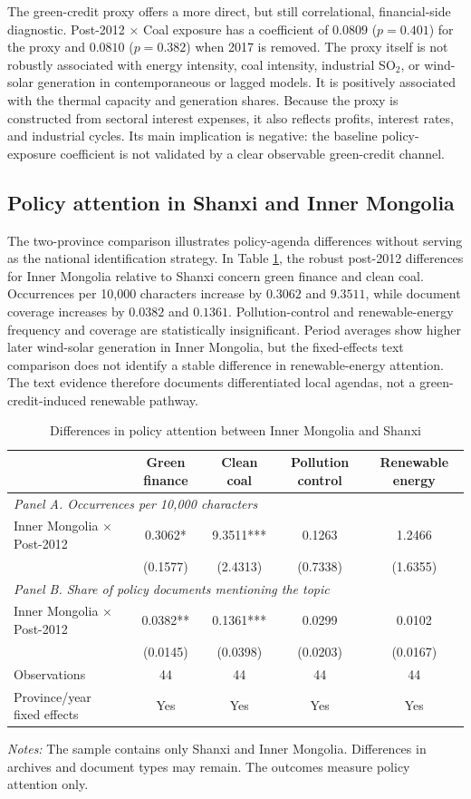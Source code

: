 \documentclass[11pt]{article}
\newcommand{\note}[1]{\begin{minipage}{0.96\textwidth}\footnotesize\textit{Notes:} #1\end{minipage}}
\begin{document}
The green-credit proxy offers a more direct, but still correlational, financial-side diagnostic. Post-2012 $\times$ Coal exposure has a coefficient of $0.0809$ ($p=0.401$) for the proxy and $0.0810$ ($p=0.382$) when 2017 is removed. The proxy itself is not robustly associated with energy intensity, coal intensity, industrial SO$_2$, or wind-solar generation in contemporaneous or lagged models. It is positively associated with the thermal capacity and generation shares. Because the proxy is constructed from sectoral interest expenses, it also reflects profits, interest rates, and industrial cycles. Its main implication is negative: the baseline policy-exposure coefficient is not validated by a clear observable green-credit channel.

\subsection{Policy attention in Shanxi and Inner Mongolia}

The two-province comparison illustrates policy-agenda differences without serving as the national identification strategy. In Table \ref{tab:text}, the robust post-2012 differences for Inner Mongolia relative to Shanxi concern green finance and clean coal. Occurrences per 10,000 characters increase by $0.3062$ and $9.3511$, while document coverage increases by $0.0382$ and $0.1361$. Pollution-control and renewable-energy frequency and coverage are statistically insignificant. Period averages show higher later wind-solar generation in Inner Mongolia, but the fixed-effects text comparison does not identify a stable difference in renewable-energy attention. The text evidence therefore documents differentiated local agendas, not a green-credit-induced renewable pathway.

\begin{table}[H]
\centering
\caption{Differences in policy attention between Inner Mongolia and Shanxi}
\label{tab:text}
\begin{tabular}{lcccc}
\toprule
 & Green finance & Clean coal & Pollution control & Renewable energy \\
\midrule
\multicolumn{5}{l}{\textit{Panel A. Occurrences per 10,000 characters}}\\
Inner Mongolia $\times$ Post-2012 & 0.3062* & 9.3511*** & 0.1263 & 1.2466 \\
 & (0.1577) & (2.4313) & (0.7338) & (1.6355) \\
\midrule
\multicolumn{5}{l}{\textit{Panel B. Share of policy documents mentioning the topic}}\\
Inner Mongolia $\times$ Post-2012 & 0.0382** & 0.1361*** & 0.0299 & 0.0102 \\
 & (0.0145) & (0.0398) & (0.0203) & (0.0167) \\
\midrule
Observations & 44 & 44 & 44 & 44 \\
Province/year fixed effects & Yes & Yes & Yes & Yes \\
\bottomrule
\end{tabular}
\note{The sample contains only Shanxi and Inner Mongolia. Differences in archives and document types may remain. The outcomes measure policy attention only.}
\end{table}
\end{document}
